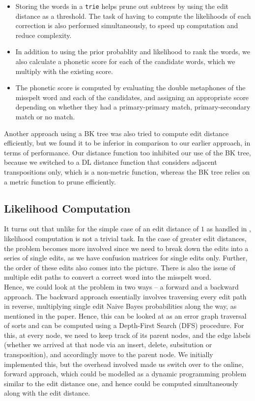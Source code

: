 \begin{itemize}
\item Storing the words in a \texttt{trie} helps prune out subtrees by using the edit distance as a threshold. The task of having to compute the likelihoods of each correction is also performed simultaneously, to speed up computation and reduce complexity.

\item In addition to using the prior probablity and likelihood to rank the words, we also calculate a phonetic score for each of the candidate words, which we multiply with the existing score.

\item The phonetic score is computed by evaluating the double metaphones of the misspelt word and each of the candidates, and assigning an appropriate score depending on whether they had a primary-primary match, primary-secondary match or no match.
\end{itemize}

Another approach using a BK tree was also tried to compute edit distance efficiently, but we found it to be inferior in comparison to our earlier approach, in terms of performance. Our distance function too inhibited our use of the BK tree, because we switched to a DL distance function that considers adjacent transpositions only, which is a non-metric function, whereas the BK tree relies on a metric function to prune efficiently.

\subsection{Likelihood Computation}
It turns out that unlike for the simple case of an edit distance of $1$ as handled in \cite{kern}, likelihood computation is not a trivial task. In the case of greater edit distances, the problem becomes more involved since we need to break down the edits into a series of single edits, as we have confusion matrices for single edits only. Further, the order of these edits also comes into the picture. There is also the issue of multiple edit paths to convert a correct word into the misspelt word.\\

Hence, we could look at the problem in two ways -- a forward and a backward approach. The backward approach essentially involves traversing every edit path in reverse, multiplying single edit Naive Bayes probabilities along the way, as mentioned in the paper. Hence, this can be looked at as an error graph traversal of sorts and can be computed using a Depth-First Search (DFS) procedure. For this, at every node, we need to keep track of its parent nodes, and the edge labels (whether we arrived at that node via an insert, delete, subsitution or transposition), and accordingly move to the parent node. We initially implemented this, but the overhead involved made us switch over to the online, forward approach, which could be modelled as a dynamic programming problem similar to the edit distance one, and hence could be computed simultaneously along with the edit distance.\\

